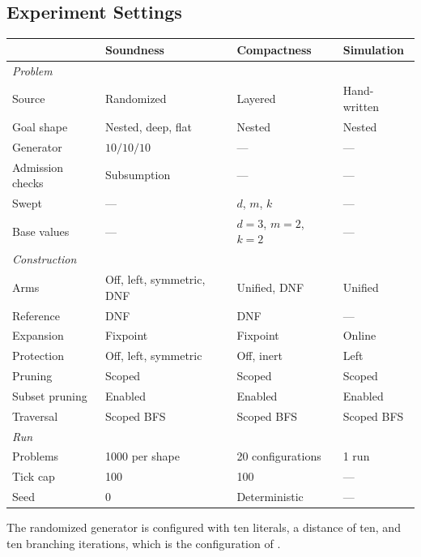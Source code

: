     \subsection{Experiment Settings}
    \label{tab:settings}
    \begin{tabular}{llll}
        \toprule
        & Soundness & Compactness & Simulation \\
        \midrule
        \multicolumn{4}{l}{\emph{Problem}} \\
        Source              & Randomized                & Layered                   & Hand-written \\
        Goal shape          & Nested, deep, flat        & Nested                    & Nested \\
        Generator           & $10/10/10$                & ---                       & --- \\
        Admission checks    & Subsumption               & ---                       & --- \\
        Swept               & ---                       & $d$, $m$, $k$             & --- \\
        Base values         & ---                       & $d{=}3$, $m{=}2$, $k{=}2$ & --- \\
        \midrule
        \multicolumn{4}{l}{\emph{Construction}} \\
        Arms                & Off, left, symmetric, DNF & Unified, DNF              & Unified \\
        Reference           & DNF                       & DNF                       & --- \\
        Expansion           & Fixpoint                  & Fixpoint                  & Online \\
        Protection          & Off, left, symmetric      & Off, inert                & Left \\
        Pruning             & Scoped                    & Scoped                    & Scoped \\
        Subset pruning      & Enabled                   & Enabled                   & Enabled \\
        Traversal           & Scoped BFS                & Scoped BFS                & Scoped BFS \\
        \midrule
        \multicolumn{4}{l}{\emph{Run}} \\
        Problems            & 1000 per shape            & 20 configurations         & 1 run \\
        Tick cap            & 100                       & 100                       & --- \\
        Seed                & 0                         & Deterministic             & --- \\
        \bottomrule
    \end{tabular}   

    The randomized generator is configured with ten literals, a distance of ten, and ten branching iterations, which is the configuration of \cite{cai2021}.